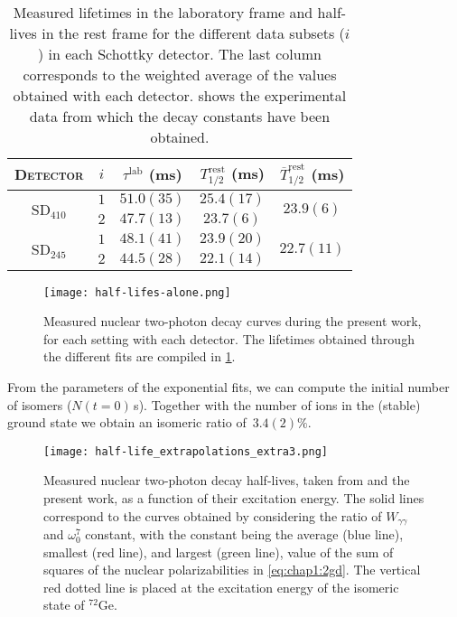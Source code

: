 \begin{table}[hbt]
  \label{tab:chap3:half-life}
  \caption{Measured lifetimes in the laboratory frame and half-lives in the rest frame for the different data subsets ($i$) in each Schottky detector. The last column corresponds to the weighted average of the values obtained with each detector.  shows the experimental data from which the decay constants have been obtained.}
  \centering
  \begin{tabular}{ccccc} 
    \toprule 
    \toprule
    \textsc{Detector} & $i$ & $\tau^{\mathrm{lab}}$ (ms) & $T_{1/2}^{\mathrm{rest}}$ (ms) & \multicolumn{1}{c}{$\overline{T}_{1/2}^{\mathrm{rest}}$ (ms)} \\ 
    \midrule\midrule
    \multirow{2}{*}{\textsc{SD}$_{410}$} & $1$ & $51.0\left(35\right)$ & $25.4\left(17\right)$ & \multirow{2}{*}{$23.9\left(6\right)$} \\ \cline{2-4}
    & $2$ & $47.7\left(13\right)$ & $23.7\left(6\right)$ &  \\
    \multirow{2}{*}{\textsc{SD}$_{245}$} & $1$ & $48.1\left(41\right)$ & $23.9\left(20\right)$ & \multirow{2}{*}{$22.7\left(11\right)$} \\ \cline{2-4}
    & $2$ & $44.5\left(28\right)$ & $22.1\left(14\right)$ & \\
    \bottomrule
    \bottomrule
  \end{tabular}
  
\end{table}

\begin{figure}[hbt]
  \centering
  \texttt{[image: half-lifes-alone.png]}
  \caption{Measured nuclear two-photon decay curves during the present work, for each setting with each detector. The lifetimes obtained through the different fits are compiled in \cref{tab:chap3:half-life}.}
  \label{fig:chap3:halflives}
\end{figure}

From the parameters of the exponential fits, we can compute the initial number of isomers ($N\left(t=0\right)$\,s). Together with the number of ions in the (stable) ground state we obtain an isomeric ratio of \,$3.4\left(2\right)\%$.

\begin{figure}[hbt]
    \centering
    \texttt{[image: half-life\_extrapolations\_extra3.png]}
    \caption{Measured nuclear two-photon decay half-lives, taken from \cite{Schirmer-1984, Kramp-1987} and the present work, as a function of their excitation energy.
    The solid lines correspond to the curves obtained by considering the ratio of $W_{\gamma\gamma}$ and $\omega_{0}^{7}$ constant, with the constant being the average (blue line), smallest (red line), and largest (green line), value of the sum of squares of the nuclear polarizabilities in \cref{eq:chap1:2gd}. The vertical red dotted line is placed at the excitation energy of the isomeric state of $^{72}\mathrm{Ge}$.}
    \label{fig:chap3:2g-all}
\end{figure}

